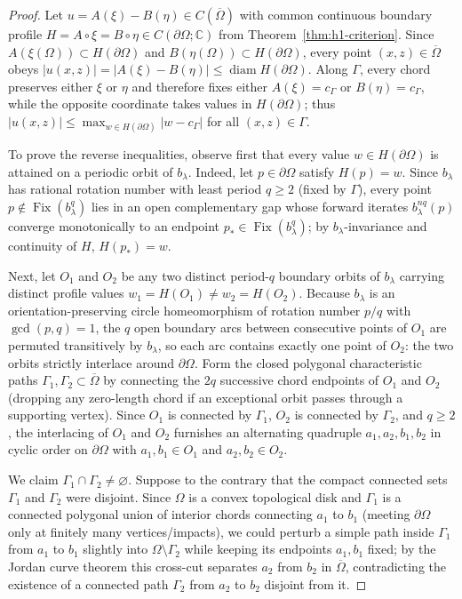 \documentclass[11pt,reqno]{amsart}
\theoremstyle{definition}
\theoremstyle{remark}
\newcommand{\C}{\mathbb{C}}
\DeclareMathOperator{\Fix}{Fix}
\DeclareMathOperator{\diam}{diam}
\begin{document}
\begin{proof}
Let $u = A(\xi) - B(\eta) \in C(\overline{\Omega})$ with common continuous boundary profile $H = A \circ \xi = B \circ \eta \in C(\partial\Omega; \C)$ from Theorem~\ref{thm:h1-criterion}. Since $A(\xi(\Omega)) \subset H(\partial\Omega)$ and $B(\eta(\Omega)) \subset H(\partial\Omega)$, every point $(x,z) \in \overline{\Omega}$ obeys $|u(x,z)| = |A(\xi) - B(\eta)| \le \diam H(\partial\Omega)$. Along $\Gamma$, every chord preserves either $\xi$ or $\eta$ and therefore fixes either $A(\xi) = c_\Gamma$ or $B(\eta) = c_\Gamma$, while the opposite coordinate takes values in $H(\partial\Omega)$; thus $|u(x,z)| \le \max_{w \in H(\partial\Omega)} |w - c_\Gamma|$ for all $(x,z) \in \Gamma$.

To prove the reverse inequalities, observe first that every value $w \in H(\partial\Omega)$ is attained on a periodic orbit of $b_\lambda$. Indeed, let $p \in \partial\Omega$ satisfy $H(p) = w$. Since $b_\lambda$ has rational rotation number with least period $q \ge 2$ (fixed by $\Gamma$), every point $p \notin \Fix(b_\lambda^q)$ lies in an open complementary gap whose forward iterates $b_\lambda^{nq}(p)$ converge monotonically to an endpoint $p_* \in \Fix(b_\lambda^q)$; by $b_\lambda$-invariance and continuity of $H$, $H(p_*) = w$.

Next, let $O_1$ and $O_2$ be any two distinct period-$q$ boundary orbits of $b_\lambda$ carrying distinct profile values $w_1 = H(O_1) \ne w_2 = H(O_2)$. Because $b_\lambda$ is an orientation-preserving circle homeomorphism of rotation number $p/q$ with $\gcd(p,q)=1$, the $q$ open boundary arcs between consecutive points of $O_1$ are permuted transitively by $b_\lambda$, so each arc contains exactly one point of $O_2$: the two orbits strictly interlace around $\partial\Omega$. Form the closed polygonal characteristic paths $\Gamma_1, \Gamma_2 \subset \overline{\Omega}$ by connecting the $2q$ successive chord endpoints of $O_1$ and $O_2$ (dropping any zero-length chord if an exceptional orbit passes through a supporting vertex). Since $O_1$ is connected by $\Gamma_1$, $O_2$ is connected by $\Gamma_2$, and $q \ge 2$, the interlacing of $O_1$ and $O_2$ furnishes an alternating quadruple $a_1, a_2, b_1, b_2$ in cyclic order on $\partial\Omega$ with $a_1, b_1 \in O_1$ and $a_2, b_2 \in O_2$.

We claim $\Gamma_1 \cap \Gamma_2 \ne \varnothing$. Suppose to the contrary that the compact connected sets $\Gamma_1$ and $\Gamma_2$ were disjoint. Since $\Omega$ is a convex topological disk and $\Gamma_1$ is a connected polygonal union of interior chords connecting $a_1$ to $b_1$ (meeting $\partial\Omega$ only at finitely many vertices/impacts), we could perturb a simple path inside $\Gamma_1$ from $a_1$ to $b_1$ slightly into $\Omega \setminus \Gamma_2$ while keeping its endpoints $a_1, b_1$ fixed; by the Jordan curve theorem this cross-cut separates $a_2$ from $b_2$ in $\overline{\Omega}$, contradicting the existence of a connected path $\Gamma_2$ from $a_2$ to $b_2$ disjoint from it.


\end{proof}
\end{document}
